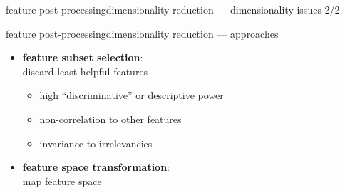 \begin{frame}{feature post-processing}{dimensionality reduction --- dimensionality issues 2/2}
\begin{itemize}
\begin{itemize}
                    \end{itemize}
            \end{itemize}
		\end{frame}
		\begin{frame}{feature post-processing}{dimensionality reduction --- approaches}
			\begin{itemize}
				\item	\textbf{feature subset selection}:\\ discard least helpful features
                    \pause
                    \begin{itemize}
                        \item	high ``discriminative'' or descriptive power
                        \item	non-correlation to other features
                        \item	invariance to irrelevancies
                    \end{itemize}
				\bigskip
				\item<2->	\textbf{feature space transformation}:\\ map feature space
			\end{itemize}
		\end{frame}
